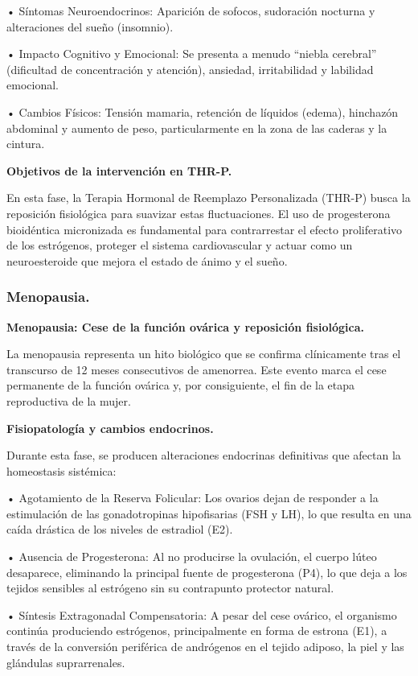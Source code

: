 \documentclass[
  spanish,
]{article}
\begin{document}
• Síntomas Neuroendocrinos: Aparición de sofocos, sudoración nocturna y alteraciones del sueño (insomnio).

• Impacto Cognitivo y Emocional: Se presenta a menudo ``niebla cerebral'' (dificultad de concentración y atención), ansiedad, irritabilidad y labilidad emocional.

• Cambios Físicos: Tensión mamaria, retención de líquidos (edema), hinchazón abdominal y aumento de peso, particularmente en la zona de las caderas y la cintura.

\textbf{Objetivos de la intervención en THR-P.}

En esta fase, la Terapia Hormonal de Reemplazo Personalizada (THR-P) busca la reposición fisiológica para suavizar estas fluctuaciones. El uso de progesterona bioidéntica micronizada es fundamental para contrarrestar el efecto proliferativo de los estrógenos, proteger el sistema cardiovascular y actuar como un neuroesteroide que mejora el estado de ánimo y el sueño.

\subsubsection{Menopausia.}\label{menopausia.}

\textbf{Menopausia: Cese de la función ovárica y reposición fisiológica.}

La menopausia representa un hito biológico que se confirma clínicamente tras el transcurso de 12 meses consecutivos de amenorrea. Este evento marca el cese permanente de la función ovárica y, por consiguiente, el fin de la etapa reproductiva de la mujer.

\textbf{Fisiopatología y cambios endocrinos.}

Durante esta fase, se producen alteraciones endocrinas definitivas que afectan la homeostasis sistémica:

• Agotamiento de la Reserva Folicular: Los ovarios dejan de responder a la estimulación de las gonadotropinas hipofisarias (FSH y LH), lo que resulta en una caída drástica de los niveles de estradiol (E2).

• Ausencia de Progesterona: Al no producirse la ovulación, el cuerpo lúteo desaparece, eliminando la principal fuente de progesterona (P4), lo que deja a los tejidos sensibles al estrógeno sin su contrapunto protector natural.

• Síntesis Extragonadal Compensatoria: A pesar del cese ovárico, el organismo continúa produciendo estrógenos, principalmente en forma de estrona (E1), a través de la conversión periférica de andrógenos en el tejido adiposo, la piel y las glándulas suprarrenales.
\end{document}
